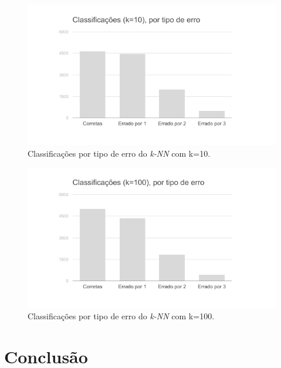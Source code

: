 \documentclass[12pt]{article}
\begin{document}
\begin{figure}[H]
\centering\includegraphics[width=.65\linewidth]{graf-white10.png}
\caption{Classificações por tipo de erro do \emph{k-NN} com k=10.}
\label{fig:graf10}
\end{figure}

\begin{figure}[H]
\centering\includegraphics[width=.65\linewidth]{graf-white100.png}
\caption{Classificações por tipo de erro do \emph{k-NN} com k=100.}
\label{fig:graf100}
\end{figure}

\section{Conclusão}
\label{sec:conclusao}
\end{document}
